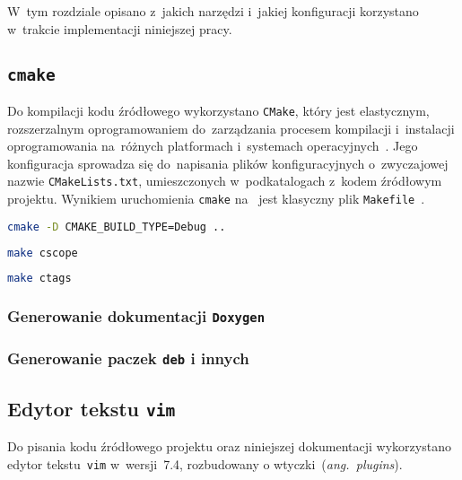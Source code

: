 \documentclass[thesis]{subfiles}
\begin{document}
W~tym rozdziale opisano z~jakich narzędzi i~jakiej konfiguracji korzystano w~trakcie implementacji niniejszej pracy.

\subsection{\texttt{cmake}}

Do kompilacji kodu źródłowego wykorzystano \texttt{CMake}, który jest elastycznym, rozszerzalnym oprogramowaniem do~zarządzania procesem kompilacji i~instalacji oprogramowania na~różnych platformach i~systemach operacyjnych~\cite{cmake}. Jego konfiguracja sprowadza się do~napisania plików konfiguracyjnych o~zwyczajowej nazwie \mbox{\texttt{CMakeLists.txt}}, umieszczonych w~podkatalogach z~kodem źródłowym projektu. Wynikiem uruchomienia \texttt{cmake} na~ jest klasyczny plik \texttt{Makefile}~\cite{gnu-makefile-manual}.

\begin{lstlisting}[language=bash,numbers=none,caption={Uruchomienie \texttt{cmake} w~trybie \texttt{Debug}}]
cmake -D CMAKE_BUILD_TYPE=Debug ..
\end{lstlisting}

\begin{lstlisting}[language=bash,numbers=none,caption={Generowanie symboli dla \texttt{cscope}}]
make cscope
\end{lstlisting}

\begin{lstlisting}[language=bash,numbers=none,caption={Generowanie symboli dla \texttt{ctags}}]
make ctags
\end{lstlisting}

\subsubsection{Generowanie dokumentacji \texttt{Doxygen}}
\subsubsection{Generowanie paczek \texttt{deb} i innych}

\subsection{Edytor tekstu \texttt{vim}}

Do pisania kodu źródłowego projektu oraz niniejszej dokumentacji wykorzystano edytor tekstu~\texttt{vim} w~wersji~7.4, rozbudowany o wtyczki~(\emph{ang.~plugins}).
\end{document}
